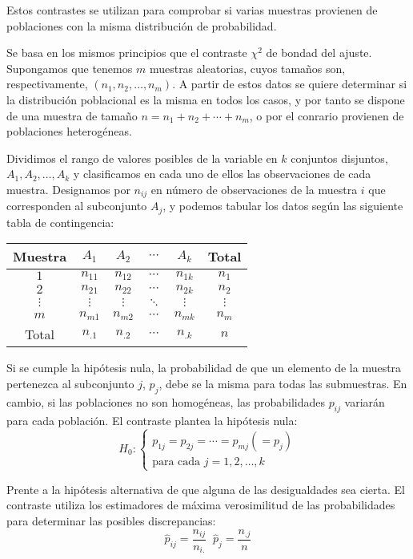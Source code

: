 Estos contrastes se utilizan para comprobar si varias muestras provienen de poblaciones con la misma distribuci\'on de probabilidad.


Se basa en los mismos principios que el contraste $\chi^2$ de bondad del ajuste. Supongamos que tenemos $m$ muestras aleatorias, cuyos tama\~nos son, respectivamente, $(n_1,n_2,\ldots,n_m)$. A partir de estos datos se quiere determinar si la distribuci\'on poblacional es la misma en todos los casos, y por tanto se dispone de una muestra de tama\~no $n=n_1+n_2+\cdots+n_m$, o por el conrario provienen de poblaciones heterog\'eneas.

Dividimos el rango de valores posibles de la variable en $k$ conjuntos disjuntos, $A_1, A_2,\ldots,A_k$ y clasificamos en cada uno de ellos las observaciones de cada muestra. Designamos por $n_{ij}$ en n\'umero de observaciones de la muestra $i$ que corresponden al subconjunto $A_j$, y podemos tabular los datos seg\'un las siguiente tabla de contingencia:




\begin{tabular}{|c||cccc|c|}
\hline 
 Muestra & $A_1$ & $A_2$ & $\cdots$ & $A_k$ & Total \tabularnewline
\hline 
$1$ & $n_{11}$ & $n_{12}$ & $\cdots$ & $n_{1k}$ & $n_{1}$ \tabularnewline
$2$ & $n_{21}$ & $n_{22}$ & $\cdots$ & $n_{2k}$ & $n_{2}$ \tabularnewline
$\vdots$ & $\vdots$ & $\vdots$ & $\ddots$ & $\vdots$ & $\vdots$ \tabularnewline
$m$ & $n_{m1}$ & $n_{m2}$ & $\cdots$ & $n_{mk}$ & $n_{m}$ \tabularnewline
\hline 
Total  & $n_{.1}$ & $n_{.2}$ & $\cdots$ & $n_{.k}$ & $n$ \tabularnewline
\hline 
\end{tabular}

Si se cumple la hip\'otesis nula, la probabilidad de que un elemento de la muestra pertenezca al subconjunto $j$, $p_j$, debe se la misma para todas las submuestras. En cambio, si las poblaciones no son homog\'eneas, las probabilidades $p_{ij}$ variar\'an para cada poblaci\'on. El contraste plantea la hip\'otesis nula:
\[H_0:\left\{\begin{matrix}
p_{1j}=p_{2j}=\cdots=p_{mj}(=p_j) \\
\text{para cada  } j=1,2,\ldots,k
\end{matrix}\right.\]

Prente a la hip\'otesis alternativa de que alguna de las desigualdades sea cierta. El contraste utiliza los estimadores de m\'axima verosimilitud de las probabilidades para determinar las posibles discrepancias: 
\[\hat{p}_{ij}=\dfrac{n_{ij}}{n_{i.}} \;\;\hat{p}_j=\dfrac{n_{.j}}{n}\]

